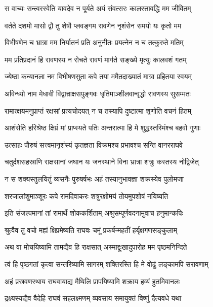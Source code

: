 \twolineshloka
{स वाच्यः सन्त्वरस्वेति यावदेव न पूर्यते}
{अयं संवत्सरः कालस्तावद्धि मम जीवितम्} %

\twolineshloka
{वर्तते दशमो मासो द्वौ तु शेषौ प्लवङ्गम}
{रावणेन नृशंसेन समयो यः कृतो मम} %

\twolineshloka
{विभीषणेन च भ्रात्रा मम निर्यातनं प्रति}
{अनुनीतः प्रयत्नेन न च तत्कुरुते मतिम्} %

\twolineshloka
{मम प्रतिप्रदानं हि रावणस्य न रोचते}
{रावणं मार्गते सङ्ख्ये मृत्युः कालवशं गतम्} %

\twolineshloka
{ज्येष्ठा कन्यानला नम विभीषणसुता कपे}
{तया ममैतदाख्यातं मात्रा प्रहितया स्वयम्} %

\twolineshloka
{अविन्ध्यो नाम मेधावी विद्वान्राक्षसपुङ्गवः}
{धृतिमाञ्शीलवान्वृद्धो रावणस्य सुसम्मतः} %

\twolineshloka
{रामात्क्षयमनुप्राप्तं रक्षसां प्रत्यचोदयत्}
{न च तस्यापि दुष्टात्मा शृणोति वचनं हितम्} %

\twolineshloka
{आशंसेति हरिश्रेष्ठ क्षिप्रं मां प्राप्स्यते पतिः}
{अन्तरात्मा हि मे शुद्धस्तस्मिंश्च बहवो गुणाः} %

\twolineshloka
{उत्साहः पौरुषं सत्त्वमानृशंस्यं कृतज्ञता}
{विक्रमश्च प्रभावश्च सन्ति वानरराघवे} %

\twolineshloka
{चतुर्दशसहस्राणि राक्षसानां जघान यः}
{जनस्थाने विना भ्रात्रा शत्रुः कस्तस्य नोद्विजेत्} %

\twolineshloka
{न स शक्यस्तुलयितुं व्यसनैः पुरुषर्षभः}
{अहं तस्यानुभावज्ञा शक्रस्येव पुलोमजा} %

\twolineshloka
{शरजालांशुमाञ्शूरः कपे रामदिवाकरः}
{शत्रुरक्षोमयं तोयमुपशोषं नयिष्यति} %

\twolineshloka
{इति संजल्पमानां तां रामार्थे शोककर्शिताम्}
{अश्रुसम्पूर्णवदनामुवाच हनुमान्कपिः} %

\twolineshloka
{श्रुत्वैव तु वचो मह्यं क्षिप्रमेष्यति राघवः}
{चमूं प्रकर्षन्महतीं हर्यृक्षगणसङ्कुलाम्} %

\twolineshloka
{अथ वा मोचयिष्यामि तामद्यैव हि राक्षसात्}
{अस्माद्दुःखादुपारोह मम पृष्ठमनिन्दिते} %

\twolineshloka
{त्वं हि पृष्ठगतां कृत्वा सन्तरिष्यामि सागरम्}
{शक्तिरस्ति हि मे वोढुं लङ्कामपि सरावणाम्} %

\twolineshloka
{अहं प्रस्रवणस्थाय राघवायाद्य मैथिलि}
{प्रापयिष्यामि शक्राय हव्यं हुतमिवानलः} %

\twolineshloka
{द्रक्ष्यस्यद्यैव वैदेहि राघवं सहलक्ष्मणम्}
{व्यवसाय समायुक्तं विष्णुं दैत्यवधे यथा} %

